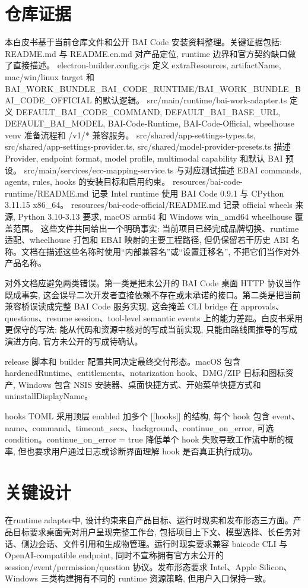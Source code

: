 \section{仓库证据}
本白皮书基于当前仓库文件和公开 BAI Code 安装资料整理。关键证据包括: README.md 与 README.en.md 对产品定位, runtime 边界和官方契约缺口做了直接描述。 electron-builder.config.cjs 定义 extraResources, artifactName, mac/win/linux target 和 BAI\_WORK\_BUNDLE\_BAI\_CODE\_RUNTIME/BAI\_WORK\_BUNDLE\_BAI\_CODE\_OFFICIAL 的默认逻辑。 src/main/runtime/bai-work-adapter.ts 定义 DEFAULT\_BAI\_CODE\_COMMAND, DEFAULT\_BAI\_BASE\_URL, DEFAULT\_BAI\_MODEL, BAI-Code-Runtime, BAI-Code-Official, wheelhouse venv 准备流程和 /v1/* 兼容服务。 src/shared/app-settings-types.ts, src/shared/app-settings-provider.ts, src/shared/model-provider-presets.ts 描述 Provider, endpoint format, model profile, multimodal capability 和默认 BAI 预设。 src/main/services/ecc-mapping-service.ts 与对应测试描述 EBAI commands, agents, rules, hooks 的安装目标和启用约束。 resources/bai-code-runtime/README.md 记录 Intel runtime 使用 BAI Code 0.9.1 与 CPython 3.11.15 x86\_64。 resources/bai-code-official/README.md 记录 official wheels 来源, Python 3.10-3.13 要求, macOS arm64 和 Windows win\_amd64 wheelhouse 覆盖范围。 这些文件共同给出一个明确事实: 当前项目已经完成品牌切换、runtime 适配、wheelhouse 打包和 EBAI 映射的主要工程路径, 但仍保留若干历史 ABI 名称。文档在描述这些名称时使用“内部兼容名”或“设置迁移名”, 不把它们当作对外产品名称。

对外文档应避免两类错误。第一类是把未公开的 BAI Code 桌面 HTTP 协议当作既成事实, 这会误导二次开发者直接依赖不存在或未承诺的接口。第二类是把当前兼容桥误读成完整 BAI Code 服务实现, 这会掩盖 CLI bridge 在 approvals、questions、resume session、tool-level semantic events 上的能力差距。白皮书采用更保守的写法: 能从代码和资源中核对的写成当前实现, 只能由路线图推导的写成演进方向, 官方未公开的写成待确认。

release 脚本和 builder 配置共同决定最终交付形态。macOS 包含 hardenedRuntime、entitlements、notarization hook、DMG/ZIP 目标和图标资产, Windows 包含 NSIS 安装器、桌面快捷方式、开始菜单快捷方式和 uninstallDisplayName。

hooks TOML 采用顶层 enabled 加多个 [[hooks]] 的结构, 每个 hook 包含 event、name、command、timeout\_secs、background、continue\_on\_error, 可选 condition。continue\_on\_error = true 降低单个 hook 失败导致工作流中断的概率, 但也要求用户通过日志或诊断界面理解 hook 是否真正执行成功。

\section{关键设计}
在runtime adapter中, 设计约束来自产品目标、运行时现实和发布形态三方面。产品目标要求桌面壳对用户呈现完整工作台, 包括项目上下文、模型选择、长任务对话、侧边会话、文件引用和生成物管理。运行时现实要求兼容 baicode CLI 与 OpenAI-compatible endpoint, 同时不宣称拥有官方未公开的 session/event/permission/question 协议。发布形态要求 Intel、Apple Silicon、Windows 三类构建拥有不同的 runtime 资源策略, 但用户入口保持一致。

